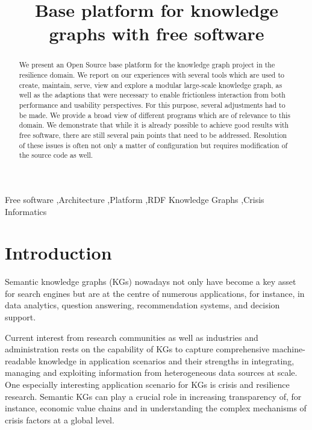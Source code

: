 \documentclass[
hf
]{ceurart}
\begin{document}
\title{Base platform for knowledge graphs with free software}



\begin{abstract}
We present an Open Source base platform for the \CoyPu knowledge graph project in the resilience domain. We report on our experiences with several tools which are used to create, maintain, serve, view and explore a modular large-scale knowledge graph, as well as 
the adaptions that were necessary to enable frictionless interaction from both performance and usability perspectives.
For this purpose, several adjustments had to be made. We provide a broad view of different programs which are of relevance to this domain. We demonstrate that while it is already possible to achieve good results with free software, there are still several pain points that need to be addressed. Resolution of these issues is often not only a matter of configuration but requires modification of the source code as well.
\end{abstract}

\begin{keywords}
Free software \sep Architecture \sep Platform \sep RDF Knowledge Graphs \sep Crisis Informatics
\end{keywords}

\maketitle

\setlength{\aweboxleftmargin}{0.06\linewidth}\setlength{\aweboxcontentwidth}{0.9\linewidth}

\section{Introduction} %

Semantic knowledge graphs (KGs) nowadays not only have become a key asset for search engines but are at the centre of numerous applications, for instance, in data analytics, question answering, recommendation systems, and decision support. 

Current interest from research communities as well as industries and administration rests on the capability of KGs to capture comprehensive machine-readable knowledge in application scenarios and their strengths in integrating, managing and exploiting information from heterogeneous data sources at scale. One especially interesting application scenario for KGs is crisis and resilience research. Semantic KGs can play a crucial role in increasing transparency of, for instance, economic value chains and in understanding the complex mechanisms of crisis factors at a global level. 
\end{document}
